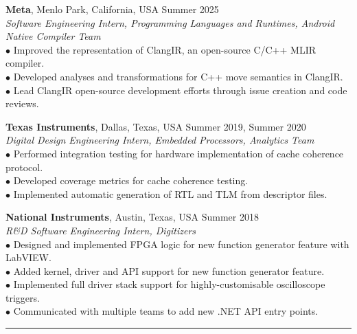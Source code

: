 \documentclass{article}
\begin{document}
\textbf{Meta}, Menlo Park, California, USA \hfill Summer 2025 \\
{\em Software Engineering Intern, Programming Languages and Runtimes, Android Native Compiler Team }   \\$\bullet$ Improved the representation of ClangIR, an open-source C/C++ MLIR compiler. \\$\bullet$ Developed analyses and transformations for C++ move semantics in ClangIR. \\$\bullet$ Lead ClangIR open-source development efforts through issue creation and code reviews. \\\vspace{0.5em}    

\textbf{Texas Instruments}, Dallas, Texas, USA \hfill Summer 2019, Summer 2020 \\
{\em Digital Design Engineering Intern, Embedded Processors, Analytics Team }   \\$\bullet$ Performed integration testing for hardware implementation of cache coherence protocol. \\$\bullet$ Developed coverage metrics for cache coherence testing. \\$\bullet$ Implemented automatic generation of RTL and TLM from descriptor files. \\\vspace{0.5em}    

\textbf{National Instruments}, Austin, Texas, USA \hfill Summer 2018 \\
{\em R\&D Software Engineering Intern, Digitizers }   \\$\bullet$ Designed and implemented FPGA logic for new function generator feature with LabVIEW. \\$\bullet$ Added kernel, driver and API support for new function generator feature. \\$\bullet$ Implemented full driver stack support for highly-customisable oscilloscope triggers. \\$\bullet$ Communicated with multiple teams to add new .NET API entry points. \\\vspace{0.5em}    


\vspace{1em}
\hrule
\vspace{0.5em}

\vspace{0.5em}
\end{document}
